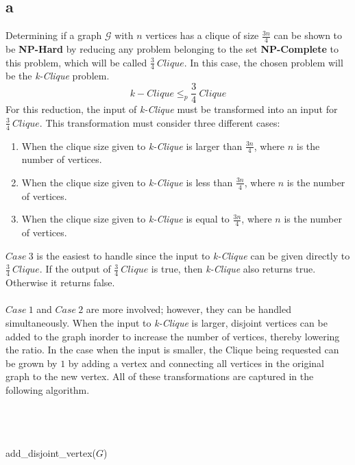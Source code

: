 \documentclass[12pt]{article}
\begin{document}
\subsection*{a}
Determining if a graph $\mathcal{G}$ with $n$
vertices has a clique of size $\frac{3n}{4}$ can be shown to be
\textbf{NP-Hard} by reducing any problem belonging to the set
\textbf{NP-Complete} to this problem, which will be called \textit{$\frac{3}{4}\ Clique$}.
In this case, the chosen problem will be the \textit{k-Clique} problem.
\[
k-Clique \leq_{p} \frac{3}{4}\ Clique
\]
For this reduction, the input of \textit{k-Clique} must be transformed
into an input for $\frac{3}{4}\ Clique$.  This transformation must
consider three different cases:
\begin{enumerate}
    \item When the clique size given to \textit{k-Clique} is larger than
          $\frac{3n}{4}$, where $n$ is the number of vertices.
    \item When the clique size given to \textit{k-Clique} is less than
          $\frac{3n}{4}$, where $n$ is the number of vertices.   
    \item When the clique size given to \textit{k-Clique} is equal to 
          $\frac{3n}{4}$, where $n$ is the number of vertices.   
\end{enumerate}
$Case\ 3$ is the easiest to handle since the input to \textit{k-Clique}
can be given directly to $\frac{3}{4}\ Clique$.  If the output of 
$\frac{3}{4}\ Clique$ is true, then \textit{k-Clique} also returns true.
Otherwise it returns false.\\\\
$Case\ 1$ and $Case\ 2$ are more involved; however, they can be handled
simultaneously.  When the input to \textit{k-Clique} is larger, disjoint
vertices can be added to the graph inorder to increase the number of vertices,
thereby lowering the ratio.  In the case when the input is smaller, the
Clique being requested can be grown by $1$ by adding a vertex and 
connecting all vertices in the original graph to the new vertex.
All of these transformations are captured in the following algorithm.\\\\    
\begin{algorithm}[H]
\\
\\
{
    {
        add\_disjoint\_vertex($G$)   
    }
}
\end{algorithm}
\end{document}
